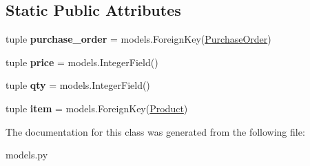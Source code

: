 \subsection*{Static Public Attributes}
\begin{DoxyCompactItemize}
\item 
\hypertarget{classlibrehatti_1_1catalog_1_1models_1_1PurchasedItem_a99aef17e99c9046543539eb9f45aa838}{tuple {\bfseries purchase\-\_\-order} = models.\-Foreign\-Key(\hyperlink{classlibrehatti_1_1catalog_1_1models_1_1PurchaseOrder}{Purchase\-Order})}\label{classlibrehatti_1_1catalog_1_1models_1_1PurchasedItem_a99aef17e99c9046543539eb9f45aa838}

\item 
\hypertarget{classlibrehatti_1_1catalog_1_1models_1_1PurchasedItem_a1db422be2bd4bc3d775ab8021755d200}{tuple {\bfseries price} = models.\-Integer\-Field()}\label{classlibrehatti_1_1catalog_1_1models_1_1PurchasedItem_a1db422be2bd4bc3d775ab8021755d200}

\item 
\hypertarget{classlibrehatti_1_1catalog_1_1models_1_1PurchasedItem_a9708cbe064d626b30eabcb2e2b3c7439}{tuple {\bfseries qty} = models.\-Integer\-Field()}\label{classlibrehatti_1_1catalog_1_1models_1_1PurchasedItem_a9708cbe064d626b30eabcb2e2b3c7439}

\item 
\hypertarget{classlibrehatti_1_1catalog_1_1models_1_1PurchasedItem_aa7832d5850ead70256725c310883e8d8}{tuple {\bfseries item} = models.\-Foreign\-Key(\hyperlink{classlibrehatti_1_1catalog_1_1models_1_1Product}{Product})}\label{classlibrehatti_1_1catalog_1_1models_1_1PurchasedItem_aa7832d5850ead70256725c310883e8d8}

\end{DoxyCompactItemize}


The documentation for this class was generated from the following file\-:\begin{DoxyCompactItemize}
\item 
models.\-py\end{DoxyCompactItemize}
